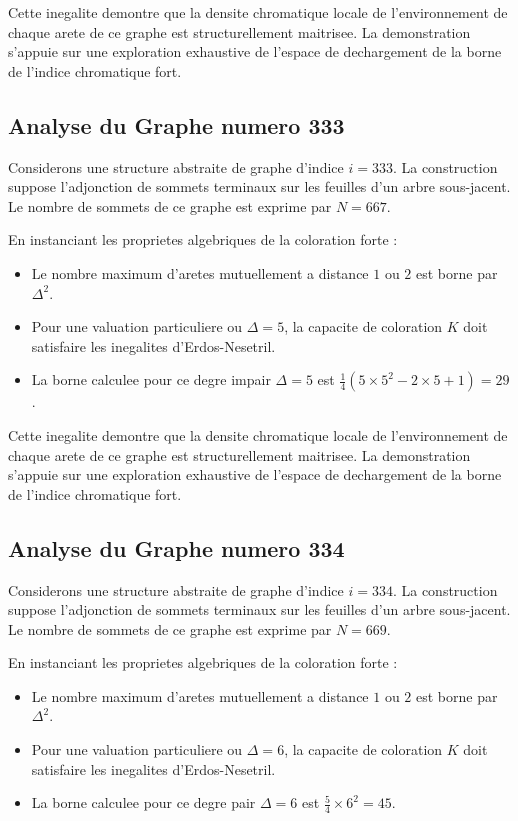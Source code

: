 \documentclass[11pt,a4paper]{article}
\begin{document}
Cette inegalite demontre que la densite chromatique locale de l'environnement de chaque arete de ce graphe est structurellement maitrisee. La demonstration s'appuie sur une exploration exhaustive de l'espace de dechargement de la borne de l'indice chromatique fort.

\subsection{Analyse du Graphe numero 333}
Considerons une structure abstraite de graphe d'indice $i = 333$. La construction suppose l'adjonction de sommets terminaux sur les feuilles d'un arbre sous-jacent. Le nombre de sommets de ce graphe est exprime par $N = 667$.

En instanciant les proprietes algebriques de la coloration forte :
\begin{itemize}
\item Le nombre maximum d'aretes mutuellement a distance $1$ ou $2$ est borne par $\Delta^2$.
\item Pour une valuation particuliere ou $\Delta = 5$, la capacite de coloration $K$ doit satisfaire les inegalites d'Erdos-Nesetril.
\item La borne calculee pour ce degre impair $\Delta = 5$ est $\frac{1}{4}(5 \times 5^2 - 2 \times 5 + 1) = 29$.
\end{itemize}

Cette inegalite demontre que la densite chromatique locale de l'environnement de chaque arete de ce graphe est structurellement maitrisee. La demonstration s'appuie sur une exploration exhaustive de l'espace de dechargement de la borne de l'indice chromatique fort.

\subsection{Analyse du Graphe numero 334}
Considerons une structure abstraite de graphe d'indice $i = 334$. La construction suppose l'adjonction de sommets terminaux sur les feuilles d'un arbre sous-jacent. Le nombre de sommets de ce graphe est exprime par $N = 669$.

En instanciant les proprietes algebriques de la coloration forte :
\begin{itemize}
\item Le nombre maximum d'aretes mutuellement a distance $1$ ou $2$ est borne par $\Delta^2$.
\item Pour une valuation particuliere ou $\Delta = 6$, la capacite de coloration $K$ doit satisfaire les inegalites d'Erdos-Nesetril.
\item La borne calculee pour ce degre pair $\Delta = 6$ est $\frac{5}{4} \times 6^2 = 45$.
\end{itemize}
\end{document}
